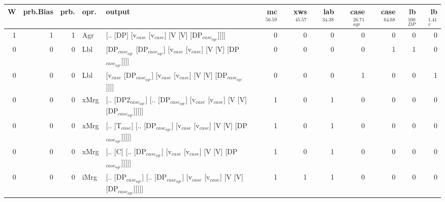 \begin{tabularx}{\linewidth}{rrrlXrrrrrrr}
\hline
   W &   prb.Bias &   prb. & opr.   & output                                                                                                  &   mc$^{56.59}$ &   xws$^{45.57}$ &   lab$^{34.38}$ &   case$_{agr}^{26.71}$ &   case$^{64.68}$ &   lb$_{DP}^{100}$ &   lb$_{v}^{1.41}$ \\
\hline
   1 &       1 &   1 & Agr  & [.. [DP] [v$_{case}$ [v$_{case}$] [V [V] [DP$_{case_{agr}}$]]]]                                                       &            0 &             0 &             0 &                  0 &              0 &                0 &             0 \\
   0 &       0 &   0 & Lbl  & [DP$_{case_{agr}}$ [DP$_{case_{agr}}$] [v$_{case}$ [v$_{case}$] [V [V] [DP$_{case_{agr}}$]]]]                                     &            0 &             0 &             0 &                  0 &              1 &                1 &             0 \\
   0 &       0 &   0 & Lbl  & [v$_{case}$ [DP$_{case_{agr}}$] [v$_{case}$ [v$_{case}$] [V [V] [DP$_{case_{agr}}$]]]]                                          &            0 &             0 &             0 &                  1 &              0 &                0 &             1 \\
   0 &       0 &   0 & xMrg & [.. [DP2$_{case_{agr}}$] [.. [DP$_{case_{agr}}$] [v$_{case}$ [v$_{case}$] [V [V] [DP$_{case_{agr}}$]]]]]                          &            1 &             0 &             1 &                  0 &              0 &                0 &             0 \\
   0 &       0 &   0 & xMrg & [.. [T$_{case}$] [.. [DP$_{case_{agr}}$] [v$_{case}$ [v$_{case}$] [V [V] [DP$_{case_{agr}}$]]]]]                                &            1 &             0 &             1 &                  0 &              0 &                0 &             0 \\
   0 &       0 &   0 & xMrg & [.. [C] [.. [DP$_{case_{agr}}$] [v$_{case}$ [v$_{case}$] [V [V] [DP$_{case_{agr}}$]]]]]                                     &            1 &             0 &             1 &                  0 &              0 &                0 &             0 \\
   0 &       0 &   0 & iMrg & [.. [DP$_{case_{agr}}$] [.. [DP$_{case_{agr}}$] [v$_{case}$ [v$_{case}$] [V [V] [DP$_{case_{agr}}$]]]]]                           &            1 &             1 &             1 &                  0 &              0 &                0 &             0 \\

\end{tabularx}
